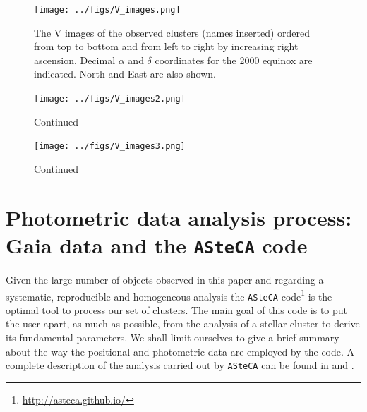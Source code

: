 \documentclass[draft]{aa}
\begin{document}
\begin{figure}[ht]
    \centering
     \texttt{[image: ../figs/V\_images.png]}   
     \caption{The V images of the observed clusters (names inserted) ordered
     from top to bottom and from left to right by increasing right ascension.
     Decimal $\alpha$ and $\delta$ coordinates for the 2000 equinox are
     indicated. North and East are also shown.}
    \label{fig2}
\end{figure}

\begin{figure}[ht]
    \addtocounter{figure}{-1}
    \centering
    \texttt{[image: ../figs/V\_images2.png]}
    \caption{Continued}
    \label{fig2a}
\end{figure}

\begin{figure}[ht]
    \addtocounter{figure}{-1}
    \centering
    \texttt{[image: ../figs/V\_images3.png]}
    \caption{Continued}
    \label{fig2b}
\end{figure}








\section{Photometric data analysis process: Gaia data and the \texttt{ASteCA}
code}
\label{sec:photom_analysis}

Given the large number of objects observed in this paper and regarding a
systematic, reproducible and homogeneous analysis the \texttt{ASteCA}
code\footnote{\url{http://asteca.github.io/}} is the optimal tool
to process our set of clusters. The main goal of this code is to put the user
apart, as much as possible, from the analysis of a stellar cluster to derive
its fundamental parameters. We shall limit ourselves to give a brief summary
about the way the positional and photometric data are employed by the code.
A complete description of the analysis carried out by
\texttt{ASteCA} can be found in \cite{Perren_2015} and \cite{Perren_2017}.
\end{document}
